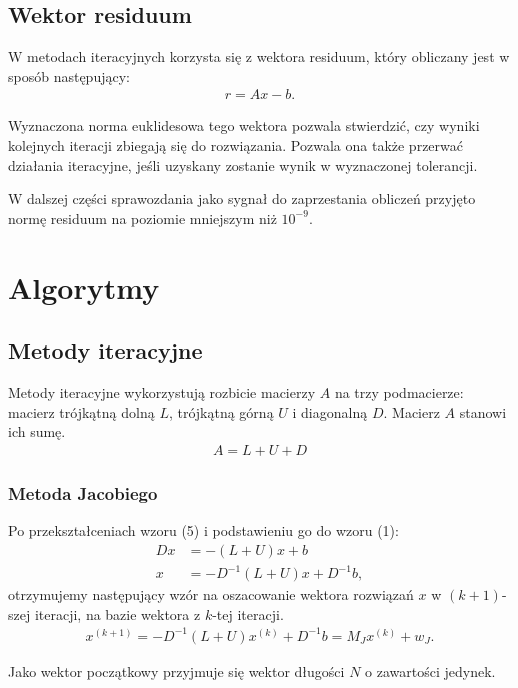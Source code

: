 \documentclass{article}
\begin{document}
\subsection{Wektor residuum}
W metodach iteracyjnych korzysta się z wektora residuum, który obliczany jest w sposób następujący:
\begin{align}
    r = Ax - b.
\end{align}

Wyznaczona norma euklidesowa tego wektora pozwala stwierdzić, czy wyniki kolejnych iteracji zbiegają się do rozwiązania. Pozwala ona także przerwać działania iteracyjne, jeśli uzyskany zostanie wynik w wyznaczonej tolerancji. 

W dalszej części sprawozdania jako sygnał do zaprzestania obliczeń przyjęto normę residuum na poziomie mniejszym niż $10^{-9}$.

\section{Algorytmy}

\subsection{Metody iteracyjne}

Metody iteracyjne wykorzystują rozbicie macierzy $A$ na trzy podmacierze: macierz trójkątną dolną $L$, trójkątną górną $U$ i diagonalną $D$. Macierz $A$ stanowi ich sumę.
\begin{align}
    A = L + U + D
\end{align}

\subsubsection{Metoda Jacobiego}
Po przekształceniach wzoru (5) i podstawieniu go do wzoru (1):
\begin{align}
    Dx &= -(L + U)x + b \\
    x &= -D^{-1}(L + U)x + D^{-1}b,
\end{align}
otrzymujemy następujący wzór na oszacowanie wektora rozwiązań $x$ w $(k+1)$-szej iteracji, na bazie wektora z $k$-tej iteracji.
\begin{align}
    x^{(k+1)} = -D^{-1}(L + U)x^{(k)} + D^{-1}b = M_Jx^{(k)} + w_J.
\end{align}

Jako wektor początkowy przyjmuje się wektor długości $N$ o zawartości jedynek.
\end{document}
